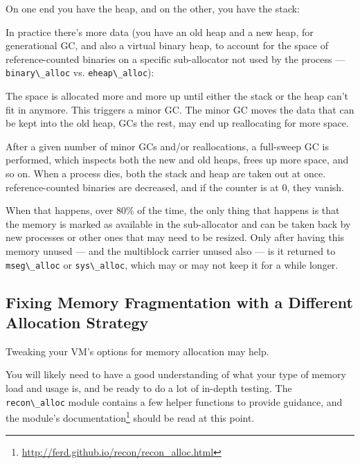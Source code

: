 \documentclass[11pt, oneside]{book}   	%
\newcommand{\module}[1]{\Verb`#1`}
\newcommand{\term}[1]{\Verb`#1`}
\begin{document}
\begin{VerbatimText}
[                  ]
\end{VerbatimText}

On one end you have the heap, and on the other, you have the stack:

\begin{VerbatimText}
\end{VerbatimText}

In practice there's more data (you have an old heap and a new heap, for generational GC, and also a virtual binary heap, to account for the space of reference-counted binaries on a specific sub-allocator not used by the process — \term{binary\_alloc} vs. \term{eheap\_alloc}):

\begin{VerbatimText}
\end{VerbatimText}

The space is allocated more and more up until either the stack or the heap can't fit in anymore. This triggers a minor GC. The minor GC moves the data that can be kept into the old heap, GCs the rest, may end up reallocating for more space.

After a given number of minor GCs and/or reallocations, a full-sweep GC is performed, which inspects both the new and old heaps, frees up more space, and so on. When a process dies, both the stack and heap are taken out at once. reference-counted binaries are decreased, and if the counter is at 0, they vanish.

When that happens, over 80\% of the time, the only thing that happens is that the memory is marked as available in the sub-allocator and can be taken back by new processes or other ones that may need to be resized. Only after having this memory unused — and the multiblock carrier unused also — is it returned to \term{mseg\_alloc} or \term{sys\_alloc}, which may or may not keep it for a while longer.

\subsection{Fixing Memory Fragmentation with a Different Allocation Strategy}

Tweaking your VM's options for memory allocation may help.

You will likely need to have a good understanding of what your type of memory load and usage is, and be ready to do a lot of in-depth testing. The \module{recon\_alloc} module contains a few helper functions to provide guidance, and the module's documentation\footnote{\href{http://ferd.github.io/recon/recon\_alloc.html}{http://ferd.github.io/recon/recon\_alloc.html}} should be read at this point.
\end{document}
